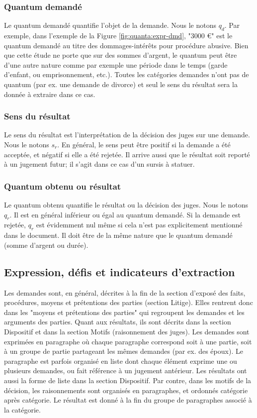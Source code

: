 \subsubsection{Quantum demandé}

Le quantum demandé quantifie l'objet de la demande. Nous le notons $q_d$. Par exemple, dans l'exemple de la Figure \ref{fig:quanta:expr-dmd}, "3000 \euro{}" est le quantum demandé au titre des dommages-intérêts pour procédure abusive. Bien que cette étude ne porte que sur des sommes d'argent, le quantum peut être d'une autre nature comme par exemple une période dans le temps (garde d'enfant, ou emprisonnement, etc.). Toutes les catégories demandes n'ont pas de quantum (par ex. une demande de divorce) et seul le sens du résultat sera la donnée à extraire dans ce cas.

\subsubsection{Sens du résultat}

Le sens du résultat est l'interprétation de la décision des juges sur une demande. Nous le notons $s_r$. En général, le sens peut être positif si la demande a été acceptée, et négatif si elle a été rejetée. Il arrive aussi que le résultat soit reporté à un jugement futur; il s'agit dans ce cas d'un sursis à statuer. 

\subsubsection{Quantum obtenu ou résultat}

Le quantum obtenu quantifie le résultat ou la décision des juges. Nous le notons $q_r$. Il est en général inférieur ou égal au quantum demandé. Si la demande est rejetée, 
$q_r$ est évidemment nul même si cela n'est pas explicitement mentionné dans le document. Il doit être de la même nature que le quantum demandé (somme d'argent ou durée).


\subsection{Expression, défis et indicateurs d'extraction}

Les demandes sont, en général, décrites à la fin de la section d'exposé des faits, procédures, moyens et prétentions des parties (section Litige). Elles rentrent donc dans les "moyens et prétentions des parties" qui regroupent les demandes et les arguments des parties. Quant aux résultats, ils sont décrits dans la section Dispositif et dans la section Motifs (raisonnement des juges). Les demandes sont exprimées en paragraphe où chaque paragraphe correspond soit à une partie, soit à un groupe de partie partageant les mêmes demandes (par ex. des époux). Le paragraphe est parfois organisé en liste dont chaque élément exprime une ou plusieurs demandes, ou fait référence à un jugement antérieur. Les résultats ont aussi la forme de liste dans la section Dispositif. Par contre, dans les motifs de la décision, les raisonnements sont organisés en paragraphes, et ordonnés catégorie après catégorie. Le résultat est donné à la fin du groupe de paragraphes associé à la catégorie.


